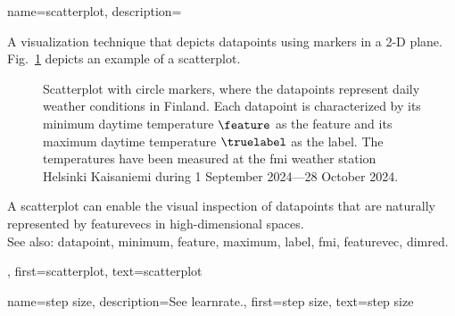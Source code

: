 {name={scatterplot}, 
	description={A 
		visualization technique that depicts \glspl{datapoint} using markers in a 2-D plane. 
		Fig.\ \ref{fig_scatterplot_temp_FMI_dict} depicts an example of a scatterplot.  
		\begin{figure}[H]
			\begin{center}
				\vspace*{-10mm}
			\end{center}
		\caption{Scatterplot with circle markers, where the \glspl{datapoint} represent daily weather conditions in Finland. 
			Each \gls{datapoint} is characterized by its \gls{minimum} daytime temperature $\feature$ 
			as the \gls{feature} and its \gls{maximum} daytime temperature $\truelabel$ as the \gls{label}. 
			The temperatures have been measured at the \gls{fmi} weather station Helsinki Kaisaniemi 
			during 1 September 2024—28 October 2024.}
			\label{fig_scatterplot_temp_FMI_dict}
			\vspace*{-3mm}
		\end{figure}
		A scatterplot can enable the visual inspection of \glspl{datapoint} that are naturally 
		represented by \glspl{featurevec} in high-dimensional spaces.
		\\
		See also: \gls{datapoint}, \gls{minimum}, \gls{feature}, \gls{maximum}, \gls{label}, \gls{fmi}, \gls{featurevec}, \gls{dimred}.},
	first={scatterplot},
	text={scatterplot} 
}

{name={step size}, 
	description={See \gls{learnrate}.}, 
	first={step size},
	text={step size} 
}


